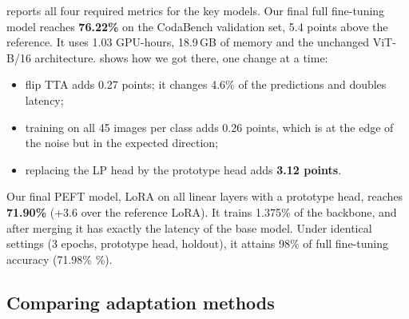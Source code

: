  reports all four required metrics for the key models.
Our final full fine-tuning model reaches \textbf{76.22\%} on the CodaBench validation set, 5.4 points above the reference.
It uses 1.03 GPU-hours, 18.9\,GB of memory and the unchanged ViT-B/16 architecture.
 shows how we got there, one change at a time:
\begin{itemize}[leftmargin=*,itemsep=0pt,topsep=2pt]
    \item flip TTA adds 0.27 points; it changes 4.6\% of the predictions and doubles latency;
    \item training on all 45 images per class adds 0.26 points, which is at the edge of the noise but in the expected direction;
    \item replacing the LP head by the prototype head adds \textbf{3.12 points}.
\end{itemize}
Our final PEFT model, LoRA on all linear layers with a prototype head, reaches \textbf{71.90\%} (+3.6 over the reference LoRA).
It trains 1.375\% of the backbone, and after merging it has exactly the latency of the base model.
Under identical settings (3 epochs, prototype head, holdout), it attains 98\% of full fine-tuning accuracy (71.98\% \%).

\subsection{Comparing adaptation methods}
\label{sec:compare}

